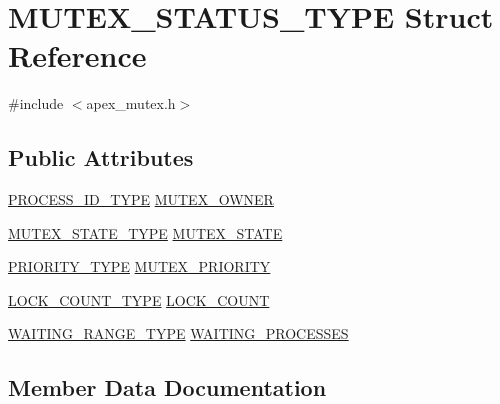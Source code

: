 \hypertarget{structMUTEX__STATUS__TYPE}{}\section{M\+U\+T\+E\+X\+\_\+\+S\+T\+A\+T\+U\+S\+\_\+\+T\+Y\+PE Struct Reference}
\label{structMUTEX__STATUS__TYPE}


{\ttfamily \#include $<$apex\+\_\+mutex.\+h$>$}

\subsection*{Public Attributes}
\begin{DoxyCompactItemize}
\item 
\hyperlink{apex__process_8h_a7a2c8e8d542c23599ac16fd978b241c4}{P\+R\+O\+C\+E\+S\+S\+\_\+\+I\+D\+\_\+\+T\+Y\+PE} \hyperlink{structMUTEX__STATUS__TYPE_aef1cf8617b1c81895e7b29718b12011b}{M\+U\+T\+E\+X\+\_\+\+O\+W\+N\+ER}
\item 
\hyperlink{apex__mutex_8h_a1a59e4fac7b528fcbd7f53ff27ce382c}{M\+U\+T\+E\+X\+\_\+\+S\+T\+A\+T\+E\+\_\+\+T\+Y\+PE} \hyperlink{structMUTEX__STATUS__TYPE_ac7e49dde3fc5d295e19f8b5dad03527a}{M\+U\+T\+E\+X\+\_\+\+S\+T\+A\+TE}
\item 
\hyperlink{apex__process_8h_a2185443fe5bfda31ff9cce2071f1b18c}{P\+R\+I\+O\+R\+I\+T\+Y\+\_\+\+T\+Y\+PE} \hyperlink{structMUTEX__STATUS__TYPE_ae7fac9b2e4453de7a4b5876e22239e40}{M\+U\+T\+E\+X\+\_\+\+P\+R\+I\+O\+R\+I\+TY}
\item 
\hyperlink{apex__mutex_8h_ad68b7b1abc606e7ce90da2f125951a71}{L\+O\+C\+K\+\_\+\+C\+O\+U\+N\+T\+\_\+\+T\+Y\+PE} \hyperlink{structMUTEX__STATUS__TYPE_adce174ada05425efe3306729c53d9c0c}{L\+O\+C\+K\+\_\+\+C\+O\+U\+NT}
\item 
\hyperlink{apex__process_8h_a77a39a661169092676366eec0d65ab1c}{W\+A\+I\+T\+I\+N\+G\+\_\+\+R\+A\+N\+G\+E\+\_\+\+T\+Y\+PE} \hyperlink{structMUTEX__STATUS__TYPE_ac944df960cdb84125b3e25e5e65f0cb2}{W\+A\+I\+T\+I\+N\+G\+\_\+\+P\+R\+O\+C\+E\+S\+S\+ES}
\end{DoxyCompactItemize}


\subsection{Member Data Documentation}
